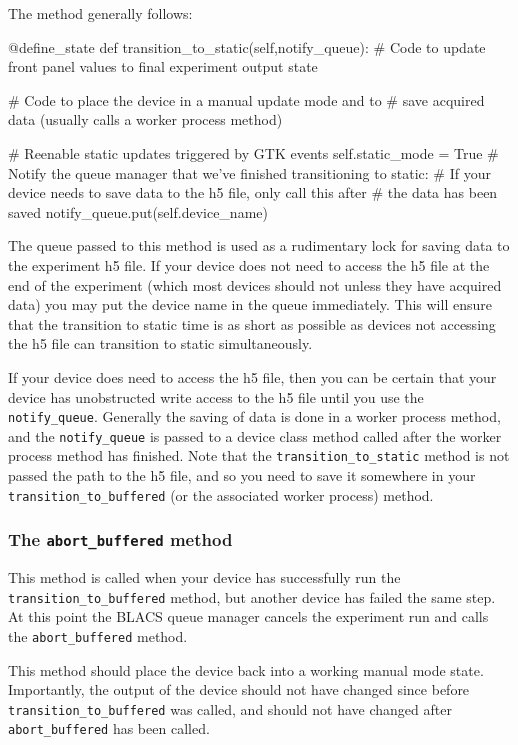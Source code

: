 \documentclass[12pt]{article}
\begin{document}
The method generally follows:
\begin{python}
    @define_state
    def transition_to_static(self,notify_queue):
        # Code to update front panel values to final experiment output state
        
        # Code to place the device in a manual update mode and to
        # save acquired data (usually calls a worker process method)
        
        # Reenable static updates triggered by GTK events
        self.static_mode = True
        # Notify the queue manager that we've finished transitioning to static:
        # If your device needs to save data to the h5 file, only call this after
        # the data has been saved
        notify_queue.put(self.device_name)
\end{python}

The queue passed to this method is used as a rudimentary lock for saving data to the experiment h5 file. If your device does not need to access the h5 file at the end of the experiment (which most devices should not unless they have acquired data) you may put the device name in the queue immediately. This will ensure that the transition to static time is as short as possible as devices not accessing the h5 file can transition to static simultaneously. 

If your device does need to access the h5 file, then you can be certain that your device has unobstructed write access to the h5 file until you use the \texttt{notify\_queue}. Generally the saving of data is done in a worker process method, and the \texttt{notify\_queue} is passed to a device class method called after the worker process method has finished. Note that the \texttt{transition\_to\_static} method is not passed the path to the h5 file, and so you need to save it somewhere in your \texttt{transition\_to\_buffered} (or the  associated worker process) method.

\subsubsection{The \texttt{abort\_buffered} method}\label{device_class_abort_buffered}
This method is called when your device has successfully run the \texttt{transition\_to\_buffered} method, but another device has failed the same step. At this point the BLACS queue manager cancels the experiment run and calls the \texttt{abort\_buffered} method. 

This method should place the device back into a working manual mode state. Importantly, the output of the device should not have changed since before \texttt{transition\_to\_buffered} was called, and should not have changed after \texttt{abort\_buffered} has been called.
\end{document}

